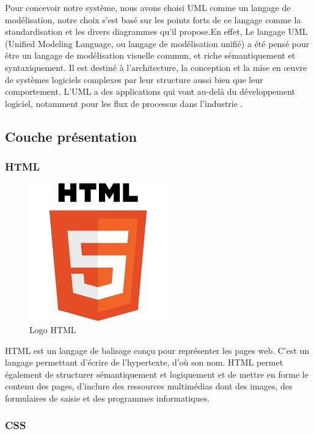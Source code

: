 Pour concevoir notre système, nous avons choisi UML comme un
langage de modélisation, notre choix s’est basé sur les points forts de
ce langage comme la standardisation et les divers diagrammes qu’il
propose.En effet, Le langage UML (Unified Modeling Language, ou langage de modélisation unifié) a été pensé pour être un langage de modélisation visuelle commun, et riche sémantiquement et syntaxiquement. Il est destiné à l'architecture, la conception et la mise en œuvre de systèmes logiciels complexes par leur structure aussi bien que leur comportement. L'UML a des applications qui vont au-delà du développement logiciel, notamment pour les flux de processus dans l'industrie \cite{UML}.

\subsection{Couche présentation}

\subsubsection{HTML}

\begin{figure}[H]
    \centering
    \includegraphics[scale=0.3]{Logos/html.png}
    \caption{Logo HTML}
\end{figure}

HTML est un langage de balisage conçu pour représenter
les pages web. C’est un langage permettant d’écrire de l’hypertexte, d’où son nom. HTML permet également de structurer sémantiquement et logiquement et de mettre en forme
le contenu des pages, d’inclure des ressources multimédias
dont des images, des formulaires de saisie et des programmes
informatiques.

\subsubsection{CSS}

